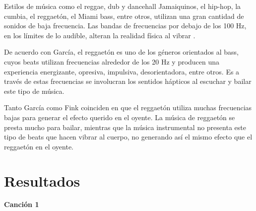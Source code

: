 \documentclass[12pt, letterpaper]{article}
\begin{document}
Estilos de música como el reggae, dub y dancehall Jamaiquinos, el hip-hop, la cumbia,
el reggaetón, el Miami bass, entre otros, utilizan una gran cantidad de sonidos de baja
frecuencia. Las bandas de frecuencias por debajo de los 100 Hz, en los límites
de lo audible, alteran la realidad física al vibrar \cite{fink-2018}.

De acuerdo con García\cite{Garcia-2016}, el reggaetón es uno de los géneros orientados al
bass, cuyos beats utilizan frecuencias alrededor de los 20 Hz y producen una experiencia
energizante, opresiva, impulsiva, desorientadora, entre otros. Es a través de estas
frecuencias se involucran los sentidos hápticos al escuchar y bailar este tipo de música.

Tanto García\cite{Garcia-2016} como Fink\cite{fink-2018} coinciden en que el reggaetón
utiliza muchas frecuencias bajas para generar el efecto querido en el oyente. La música
de reggaetón se presta mucho para bailar, mientras que la música instrumental no presenta
este tipo de beats que hacen vibrar al cuerpo, no generando así el mismo efecto
que el reggaetón en el oyente.

\newpage
\section{Resultados}

\textbf{\large{Canción 1}}
\end{document}
